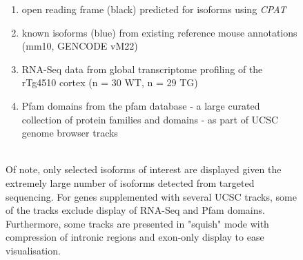 \begin{figure}[htp]
{\begin{enumerate}[label=\textbf{(\Alph*)}]
		\item open reading frame (black) predicted for isoforms using \textit{CPAT} 
		\item known isoforms (blue) from existing reference mouse annotations (mm10, GENCODE vM22)
		\item RNA-Seq data from global transcriptome profiling of the rTg4510 cortex\cite{Castanho2020} (n = 30 WT, n = 29 TG)
		\item Pfam domains from the pfam database - a large curated collection of protein families and domains - as part of UCSC genome browser tracks	
		\\ \\	
	\end{enumerate} 

	Of note, only selected isoforms of interest are displayed given the extremely large number of isoforms detected from targeted sequencing. For genes supplemented with several UCSC tracks, some of the tracks exclude display of RNA-Seq and Pfam domains. Furthermore, some tracks are presented in "squish" mode with compression of intronic regions and exon-only display to ease visualisation. 
	}   
	\label{fig:eg_track}
\end{figure}


